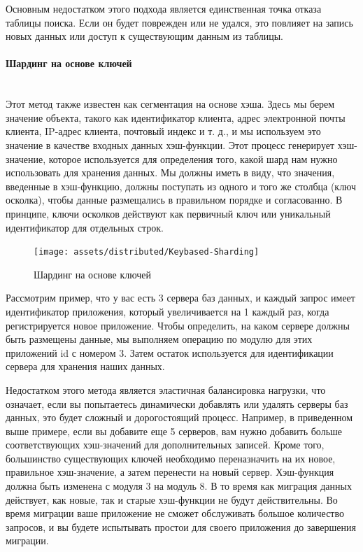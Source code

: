 Основным недостатком этого подхода является единственная точка отказа таблицы поиска. Если он будет поврежден или не
удался, это повлияет на запись новых данных или доступ к существующим данным из таблицы. \autocite{DatabaseSharding}

\paragraph{Шардинг на основе ключей} ~\\
Этот метод также известен как сегментация на основе хэша. Здесь мы берем значение объекта, такого как идентификатор
клиента, адрес электронной почты клиента, IP-адрес клиента, почтовый индекс и т. д., и мы используем это значение в
качестве входных данных хэш-функции. Этот процесс генерирует хэш-значение, которое используется для определения того,
какой шард нам нужно использовать для хранения данных. Мы должны иметь в виду, что значения, введенные в хэш-функцию,
должны поступать из одного и того же столбца (ключ осколка), чтобы данные размещались в правильном порядке и
согласованно. В принципе, ключи осколков действуют как первичный ключ или уникальный идентификатор для отдельных строк.

\begin{figure}[H]
    \centering
    \texttt{[image: assets/distributed/Keybased-Sharding]}
    \caption{Шардинг на основе ключей}
    \label{fig:Keybased-Sharding}
\end{figure}

Рассмотрим пример, что у вас есть 3 сервера баз данных, и каждый запрос имеет идентификатор приложения, который
увеличивается на 1 каждый раз, когда регистрируется новое приложение. Чтобы определить, на каком сервере должны быть
размещены данные, мы выполняем операцию по модулю для этих приложений id с номером 3. Затем остаток используется для
идентификации сервера для хранения наших данных.

Недостатком этого метода является эластичная балансировка нагрузки, что означает, если вы попытаетесь динамически
добавлять или удалять серверы баз данных, это будет сложный и дорогостоящий процесс. Например, в приведенном выше
примере, если вы добавите еще 5 серверов, вам нужно добавить больше соответствующих хэш-значений для дополнительных
записей. Кроме того, большинство существующих ключей необходимо переназначить на их новое, правильное хэш-значение,
а затем перенести на новый сервер. Хэш-функция должна быть изменена с модуля 3 на модуль 8. В то время как миграция
данных действует, как новые, так и старые хэш-функции не будут действительны. Во время миграции ваше приложение не
сможет обслуживать большое количество запросов, и вы будете испытывать простои для своего приложения до завершения
миграции. \autocite{DatabaseSharding}

